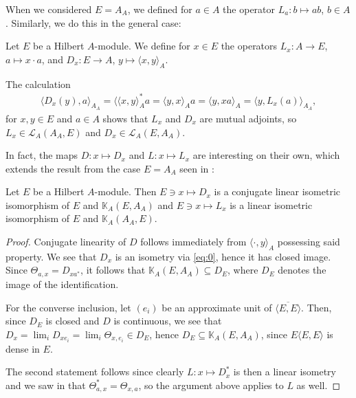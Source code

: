 When we considered $E=A_A$, we defined for $a \in A$ the operator $L_a\colon b \mapsto ab$, $b \in A$. Similarly, we do this in the general case:
\begin{definition}
	Let $E$ be a Hilbert $A$-module. We define for $x \in E$ the operators $L_x\colon A \to E$, $a \mapsto x \cdot a$, and $D_x \colon E \to A$, $y \mapsto \langle x,y\rangle_A$.
\end{definition}
\begin{remark}
The calculation	
\begin{align*}
	\langle D_x(y), a \rangle_{A_A} = \langle \langle x,y\rangle_A^*a = \langle y,x \rangle_A a = \langle y , x a \rangle_A = \langle y, L_x(a)\rangle_{A_A},
\end{align*}
for $x,y \in E$ and $a \in A$ shows that $L_x$ and $D_x$ are mutual adjoints, so $L_x \in \mathcal{L}_A(A_A,E)$ and $D_x \in \mathcal{L}_A(E,A_A)$.
\end{remark}
In fact, the maps $D \colon x \mapsto D_x$ and $L \colon x \mapsto L_x$ are interesting on their own, which extends the result from the case $E=A_A$ seen in :
\begin{lemma}
	Let $E$ be a Hilbert $A$-module. Then $E \ni x \mapsto D_x$ is a conjugate linear isometric isomorphism of $E$ and $\mathbb{K}_A(E,A_A)$ and $E \ni x \mapsto L_x$ is a linear isometric isomorphism of $E$ and $\mathbb{K}_A(A_A,E)$.
	\label{mult:isocompactgen}
\end{lemma}
\begin{proof}
	Conjugate linearity of $D$ follows immediately from $\langle \cdot, y \rangle_A$ possessing said property. We see that $D_x$ is an isometry via \cref{eq:0}, hence it has closed image. Since $\Theta_{a,x} = D_{x a^*}$, it follows that $\mathbb{K}_A(E,A_A) \subseteq D_{E}$, where $D_E$ denotes the image of the identification.
	
	For the converse inclusion, let $(e_i)$ be an approximate unit of $\overline{\langle E,E\rangle}$. Then, since $D_E$ is closed and $D$ is continuous, we see that $D_x=\lim_i D_{xe_i} = \lim_i \Theta_{x,e_i} \in D_E$, hence $D_E \subseteq \mathbb{K}_A(E,A_A)$, since $E \langle E,E\rangle$ is dense in $E$.	
	
	The second statement follows since clearly $L \colon x \mapsto D_x^*$ is then a linear isometry and we saw in  that $\Theta_{a,x}^* = \Theta_{x,a}$, so the argument above applies to $L$ as well.
\end{proof}

